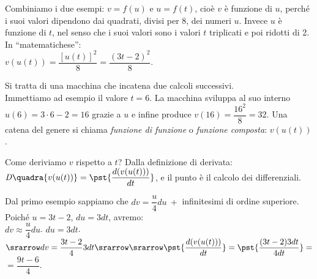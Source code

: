 Combiniamo i due esempi: $v=f(u)$ e $u=f(t)$, cioè $v$ è funzione di $u$, 
perché i suoi valori dipendono dai quadrati, divisi per $8$, dei numeri $u$.
Invece $u$ è funzione di $t$, nel senso che i suoi valori sono i valori $t$ 
triplicati e poi ridotti di 2. In ``matematichese'':\\
$v(u(t))=\dfrac{[u(t)]^2}{8}=\dfrac{(3t-2)^2}{8}$.


\begin{inaccessibleblock}
 \begin{center}
 \begin{minipage}[]{.48\textwidth}
  \boxfcomposta
 \end{minipage} 
 \hfill
 \begin{minipage}[]{.48\textwidth}
Si tratta di una macchina che incatena due calcoli successivi.\\
Immettiamo ad esempio il valore $t=6$. La macchina sviluppa al suo interno 
$u(6)=3\cdot 6-2=16$ grazie a $u$ e infine produce $v(16)=\dfrac{16^2}{8}=32$.
Una catena del genere si chiama \emph{funzione di funzione} o
\emph{funzione composta}: $v(u(t))$.\\
 \end{minipage}
 \end{center}
\end{inaccessibleblock}
\label{}

Come deriviamo  $v$ rispetto a $t$? Dalla definizione di derivata: 
$\mathit{D}\quadra{v(u(t))}=\pst{\dfrac{d(v(u(t)))}{dt}}$, 
e il punto è il calcolo dei differenziali.
\begin{inaccessibleblock}
 \begin{center}
 \begin{minipage}[]{.48\textwidth}
  \diffcomposta
 \end{minipage} 
  \hfill
 \begin{minipage}[]{.48\textwidth}
Dal primo esempio sappiamo che $dv=\dfrac{u}{4}du\ +$ infinitesimi di 
ordine 
superiore.
Poiché $u=3t-2$, $du=3dt$, avremo:\\
$dv\approx \dfrac{u}{4}du$. \hspace{1cm} $du=3dt$. $\srarrow 
dv=\dfrac{3t-2}{4}3dt \srarrow\\ 
\srarrow 
\pst{\dfrac{d(v(u(t)))}{dt}}=\pst{\dfrac{(3t-2)3dt}{4dt}}=$
$=\dfrac{9t-6}{4}$.
 \end{minipage}
 \end{center}
\end{inaccessibleblock}
\label{}

